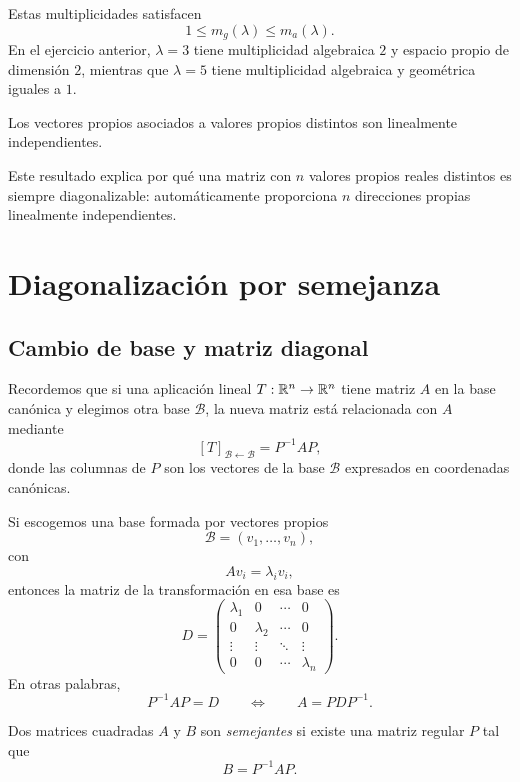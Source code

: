 Estas multiplicidades satisfacen
\[
1\leq m_g(\lambda)\leq m_a(\lambda).
\]
En el ejercicio anterior, $\lambda=3$ tiene multiplicidad algebraica $2$ y espacio propio de dimensión $2$, mientras que $\lambda=5$ tiene multiplicidad algebraica y geométrica iguales a $1$.

\begin{proposition}
Los vectores propios asociados a valores propios distintos son linealmente independientes.
\end{proposition}

Este resultado explica por qué una matriz con $n$ valores propios reales distintos es siempre diagonalizable: automáticamente proporciona $n$ direcciones propias linealmente independientes.

\section{Diagonalización por semejanza}
\label{sec:diagonalizacion-semejanza}

\subsection{Cambio de base y matriz diagonal}

Recordemos que si una aplicación lineal $T:\mathbb{R}^n\to\mathbb{R}^n$ tiene matriz $A$ en la base canónica y elegimos otra base $\mathcal B$, la nueva matriz está relacionada con $A$ mediante
\[
[T]_{\mathcal B\leftarrow\mathcal B}=P^{-1}AP,
\]
donde las columnas de $P$ son los vectores de la base $\mathcal B$ expresados en coordenadas canónicas.

Si escogemos una base formada por vectores propios
\[
\mathcal B=(v_1,\ldots,v_n),
\]
con
\[
Av_i=\lambda_i v_i,
\]
entonces la matriz de la transformación en esa base es
\[
D=\begin{pmatrix}
\lambda_1&0&\cdots&0\\
0&\lambda_2&\cdots&0\\
\vdots&\vdots&\ddots&\vdots\\
0&0&\cdots&\lambda_n
\end{pmatrix}.
\]
En otras palabras,
\[
P^{-1}AP=D
\qquad\Longleftrightarrow\qquad
A=PDP^{-1}.
\]

\begin{definition}
Dos matrices cuadradas $A$ y $B$ son \emph{semejantes} si existe una matriz regular $P$ tal que
\[
B=P^{-1}AP.
\]
\end{definition}

